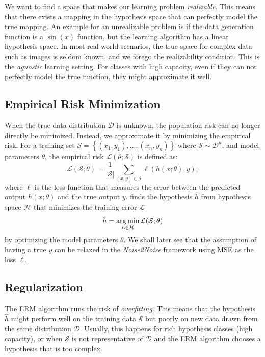 We want to find a space that makes our learning problem \textit{realizable}. This means that there exists a mapping in the hypothesis space that can perfectly model the true mapping. An example for an unrealizable problem is if the data generation function is a $\sin(x)$ function, but the learning algorithm has a linear hypothesis space. In most real-world scenarios, the true space for complex data such as images is seldom known, and we forego the realizability condition. This is the \textit{agnostic} learning setting. For classes with high capacity, even if they can not perfectly model the true function, they might approximate it well.

\subsection{Empirical Risk Minimization}
When the true data distribution $\mathcal{D}$ is unknown, the population risk can no longer directly be minimized. Instead, we approximate it by minimizing the empirical risk. For a training set $\mathcal{S} = \left\{ (x_1, y_1), \ldots, (x_n, y_n) \right\}$ where $\mathcal{S} \sim \mathcal{D}^n$, and model parameters $\theta$, the empirical risk $\mathcal{L}(\theta; \mathcal{S})$ is defined as:
\begin{equation}
    \mathcal{L}(\mathcal{S}; \theta) = \frac{1}{\lvert \mathcal{S} \rvert} \sum_{(x, y) \in \mathcal{S}} \ell(h(x; \theta), y),
\end{equation}
where $\ell$ is the loss function that measures the error between the predicted output $h(x; \theta)$ and the true output $y$.  finds the hypothesis $\hat{h}$ from hypothesis space $\mathcal{H}$ that minimizes the training error $\mathcal{L}$
\begin{equation}
    \hat{h} = \operatorname*{arg\,min}_{h \in \mathcal{H}} \mathcal{L}(\mathcal{S};\theta)
\end{equation}
by optimizing the model parameters $\theta$.
We shall later see that the assumption of having a true $y$ can be relaxed in the \textit{Noise2Noise} framework using \gls{MSE} as the loss $\ell$. 

\subsection{Regularization}
The \gls{ERM} algorithm runs the risk of \textit{overfitting}. This means that the hypothesis $\hat{h}$ might perform well on the training data $\mathcal{S}$ but poorly on new data drawn from the same distribution $\mathcal{D}$. Usually, this happens for rich hypothesis classes (high capacity), or when $\mathcal{S}$ is not representative of $\mathcal{D}$ and the \gls{ERM} algorithm chooses a hypothesis that is too complex. 

